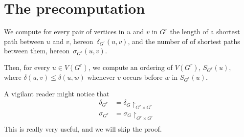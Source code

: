 \section{The precomputation}
We compute for every pair of vertices in $u$ and $v$ in $G^r$ the
length of a shortest path between $u$ and $v$, hereon~$\delta_{G^r}(u, v)$,
and the number of of shortest paths between them, hereon~$\sigma_{G^r}(u, v)$.

Then, for every $u \in V(G^r)$, we compute an ordering of $V(G^r)$,
$S_{G^r}(u)$, where $\delta(u, v) \leq \delta(u, w)$ whenever
$v$ occurs before $w$ in $S_{G^r}(u)$.

A vigilant reader might notice that
\begin{align*}
\delta_{G^r} &= \delta_{G}\restriction_{G^r \times G^r}\\
\sigma_{G^r} &= \sigma_{G}\restriction_{G^r \times G^r}\\
\end{align*}
This is really very useful, and we will skip the proof.
